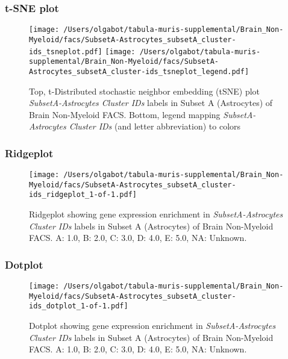 \clearpage
\subsubsection{t-SNE plot}
\begin{figure}[h]
\centering
\texttt{[image: /Users/olgabot/tabula-muris-supplemental/Brain\_Non-Myeloid/facs/SubsetA-Astrocytes\_subsetA\_cluster-ids\_tsneplot.pdf]}
\texttt{[image: /Users/olgabot/tabula-muris-supplemental/Brain\_Non-Myeloid/facs/SubsetA-Astrocytes\_subsetA\_cluster-ids\_tsneplot\_legend.pdf]}
\caption{Top, t-Distributed stochastic neighbor embedding (tSNE) plot  \emph{SubsetA-Astrocytes Cluster IDs} labels in Subset A (Astrocytes) of Brain Non-Myeloid FACS. Bottom, legend mapping \emph{SubsetA-Astrocytes Cluster IDs} (and letter abbreviation) to colors}
\end{figure}


\clearpage

\subsubsection{Ridgeplot}
\begin{figure}[h]
\centering
\texttt{[image: /Users/olgabot/tabula-muris-supplemental/Brain\_Non-Myeloid/facs/SubsetA-Astrocytes\_subsetA\_cluster-ids\_ridgeplot\_1-of-1.pdf]}

\caption{ Ridgeplot  showing gene expression enrichment in \emph{SubsetA-Astrocytes Cluster IDs} labels in Subset A (Astrocytes) of Brain Non-Myeloid FACS. A: 1.0, B: 2.0, C: 3.0, D: 4.0, E: 5.0, NA: Unknown.}
\end{figure}


\clearpage

\subsubsection{Dotplot}
\begin{figure}[h]
\centering
\texttt{[image: /Users/olgabot/tabula-muris-supplemental/Brain\_Non-Myeloid/facs/SubsetA-Astrocytes\_subsetA\_cluster-ids\_dotplot\_1-of-1.pdf]}

\caption{ Dotplot  showing gene expression enrichment in \emph{SubsetA-Astrocytes Cluster IDs} labels in Subset A (Astrocytes) of Brain Non-Myeloid FACS. A: 1.0, B: 2.0, C: 3.0, D: 4.0, E: 5.0, NA: Unknown.}
\end{figure}


\clearpage

